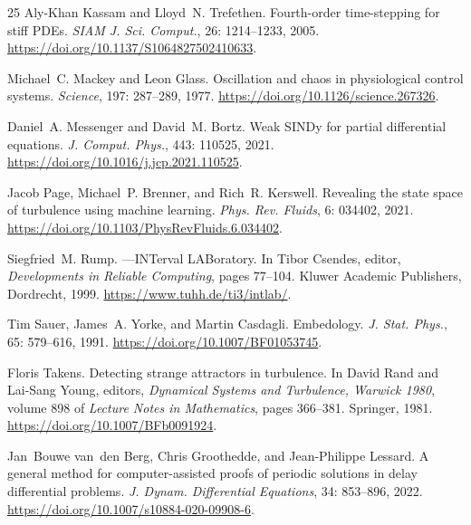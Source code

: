 \documentclass[11pt]{article}
\begin{document}
\begin{thebibliography}{25}
Aly-Khan Kassam and Lloyd~N. Trefethen.
\newblock Fourth-order time-stepping for stiff {PDEs}.
\newblock \emph{SIAM J. Sci. Comput.}, 26: 1214--1233, 2005.
\newblock \url{https://doi.org/10.1137/S1064827502410633}.

Michael~C. Mackey and Leon Glass.
\newblock Oscillation and chaos in physiological control systems.
\newblock \emph{Science}, 197: 287--289, 1977.
\newblock \url{https://doi.org/10.1126/science.267326}.

Daniel~A. Messenger and David~M. Bortz.
\newblock Weak {SINDy} for partial differential equations.
\newblock \emph{J. Comput. Phys.}, 443: 110525, 2021.
\newblock \url{https://doi.org/10.1016/j.jcp.2021.110525}.

Jacob Page, Michael~P. Brenner, and Rich~R. Kerswell.
\newblock Revealing the state space of turbulence using machine learning.
\newblock \emph{Phys. Rev. Fluids}, 6: 034402, 2021.
\newblock \url{https://doi.org/10.1103/PhysRevFluids.6.034402}.

Siegfried~M. Rump.
---{INTerval LABoratory}.
\newblock In Tibor Csendes, editor, \emph{Developments in Reliable Computing},
  pages 77--104. Kluwer Academic Publishers, Dordrecht, 1999.
\newblock \url{https://www.tuhh.de/ti3/intlab/}.

Tim Sauer, James~A. Yorke, and Martin Casdagli.
\newblock Embedology.
\newblock \emph{J. Stat. Phys.}, 65: 579--616, 1991.
\newblock \url{https://doi.org/10.1007/BF01053745}.

Floris Takens.
\newblock Detecting strange attractors in turbulence.
\newblock In David Rand and Lai-Sang Young, editors, \emph{Dynamical Systems
  and Turbulence, Warwick 1980}, volume 898 of \emph{Lecture Notes in
  Mathematics}, pages 366--381. Springer, 1981.
\newblock \url{https://doi.org/10.1007/BFb0091924}.

Jan~Bouwe van~den Berg, Chris Groothedde, and Jean-Philippe Lessard.
\newblock A general method for computer-assisted proofs of periodic solutions
  in delay differential problems.
\newblock \emph{J. Dynam. Differential Equations}, 34: 853--896, 2022.
\newblock \url{https://doi.org/10.1007/s10884-020-09908-6}.


\end{thebibliography}
\end{document}
